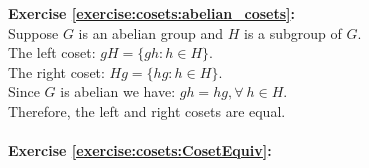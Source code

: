\noindent\textbf{Exercise \ref{exercise:cosets:abelian_cosets}:}
\\
Suppose $G$ is an abelian group and $H$ is a subgroup of $G$.
\\
The left coset: $gH = \{gh: h \in H\}$.
\\
The right coset: $Hg = \{hg: h \in H\}$.
\\
Since $G$ is abelian we have: $gh = hg, \forall \  h \in H$.
\\
Therefore, the left and right cosets are equal.
\\
\\
\textbf{Exercise \ref{exercise:cosets:CosetEquiv}:}
%
%
%
%
